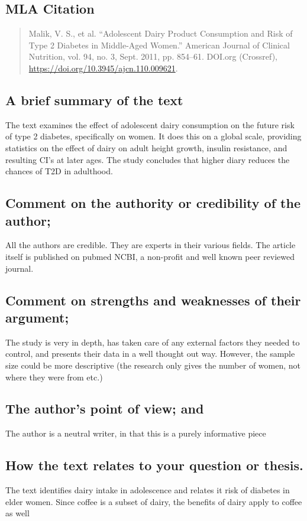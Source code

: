 \documentclass{scrartcl}
\begin{document}
\subsection{MLA Citation}
\label{sec:org23ae21b}
\begin{quote}
Malik, V. S., et al. “Adolescent Dairy Product Consumption and Risk of Type 2 Diabetes in Middle-Aged Women.” American Journal of Clinical Nutrition, vol. 94, no. 3, Sept. 2011, pp. 854–61. DOI.org (Crossref), \url{https://doi.org/10.3945/ajcn.110.009621}.
\end{quote}
\subsection{A brief summary of the text}
\label{sec:org1581e2c}
The text examines the effect of adolescent dairy consumption on the future risk of type 2 diabetes, specifically on women. It does this on a global scale, providing statistics on the effect of dairy on adult height growth, insulin resistance, and resulting CI's at later ages. The study concludes that higher diary reduces the chances of T2D in adulthood.
\subsection{Comment on the authority or credibility of the author;}
\label{sec:org29fed60}
All the authors are credible. They are experts in their various fields. The article itself is published on pubmed NCBI, a non-profit and well known peer reviewed journal.
\subsection{Comment on strengths and weaknesses of their argument;}
\label{sec:org0f1b969}
The study is very in depth, has taken care of any external factors they needed to control, and presents their data in a well thought out way. However, the sample size could be more descriptive (the research only gives the number of women, not where they were from etc.)
\subsection{The author’s point of view; and}
\label{sec:orgae33f3d}
The author is a neutral writer, in that this is a purely informative piece
\subsection{How the text relates to your question or thesis.}
\label{sec:org0165600}
The text identifies dairy intake in adolescence and relates it risk of diabetes in elder women. Since coffee is a subset of dairy, the benefits of dairy apply to coffee as well
\end{document}
